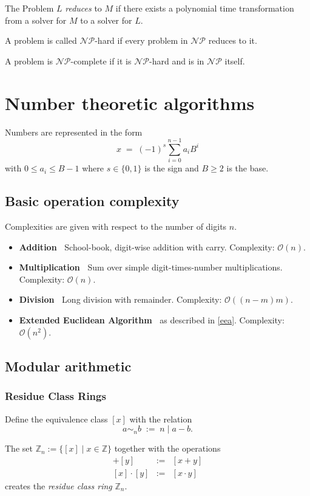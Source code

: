 \documentclass[a4paper]{scrartcl}
\newcommand\Z{\mathbb Z}
\newcommand\bigO{\mathcal O}
\newcommand\compNP{\mathcal{NP}}
\newcommand\linetag[1]{\textbf{\sffamily#1\;\ }}
\begin{document}
The Problem $L$ \textit{reduces} to $M$ if there exists a polynomial time transformation from a solver for $M$ to a solver for $L$.

A problem is called $\compNP$-hard if every problem in $\compNP$ reduces to it.

A problem is $\compNP$-complete if it is $\compNP$-hard and is in $\compNP$ itself.

\section{Number theoretic algorithms}

Numbers are represented in the form
\[x\;=\;(-1)^s\sum_{i=0}^{n-1}a_iB^i\]
with $0\leq a_i\leq B-1$ where $s\in\{0,1\}$ is the sign and $B\geq2$ is the base.

\subsection{Basic operation complexity}
Complexities are given with respect to the number of digits $n$.

\begin{itemize}
    \item \linetag{Addition} School-book, digit-wise addition with carry. Complexity: $\bigO(n)$. 
    \item \linetag{Multiplication} Sum over simple digit-times-number multiplications. Complexity: $\bigO(n)$.
    \item \linetag{Division} Long division with remainder. Complexity: $\bigO((n-m)m)$.
    \item \linetag{Extended Euclidean Algorithm} as described in \ref{eea}. Complexity: $\bigO(n^2)$.
\end{itemize}

\subsection{Modular arithmetic}

\subsubsection{Residue Class Rings}

Define the equivalence class $[x]$ with the relation \[a\sim_nb\;:=\;n\mid a-b.\]

The set $\Z_n:=\{[x]\mid x\in\Z\}$ together with the operations
\begin{eqnarray*}
    [x]+[y]&:=&[x+y]\\{}
    [x]\cdot[y]&:=&[x\cdot y]
\end{eqnarray*}
creates the \textit{residue class ring} $\Z_n$.
\end{document}
